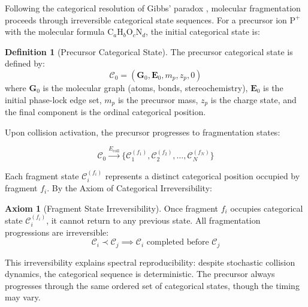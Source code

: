 \documentclass[twocolumn,10pt,a4paper]{article}
\theoremstyle{definition}
\newtheorem{definition}[theorem]{Definition}
\newtheorem{axiom}[theorem]{Axiom}
\theoremstyle{remark}
\begin{document}
Following the categorical resolution of Gibbs' paradox \cite{sachikonye2024gibbs}, molecular fragmentation proceeds through irreversible categorical state sequences. For a precursor ion $\text{P}^+$ with the molecular formula $\text{C}_a\text{H}_b\text{O}_c\text{N}_d$, the initial categorical state is:

\begin{definition}[Precursor Categorical State]
\label{def:precursor_state}
The precursor categorical state is defined by:
\begin{equation}
\mathcal{C}_0 = (\mathbf{G}_0, \mathbf{E}_0, m_p, z_p, 0)
\end{equation}
where $\mathbf{G}_0$ is the molecular graph (atoms, bonds, stereochemistry), $\mathbf{E}_0$ is the initial phase-lock edge set, $m_p$ is the precursor mass, $z_p$ is the charge state, and the final component is the ordinal categorical position.
\end{definition}

Upon collision activation, the precursor progresses to fragmentation states:

\begin{equation}
\mathcal{C}_0 \xrightarrow{E_{\text{coll}}} \{\mathcal{C}_1^{(f_1)}, \mathcal{C}_2^{(f_2)}, \ldots, \mathcal{C}_N^{(f_N)}\}
\end{equation}

Each fragment state $\mathcal{C}_i^{(f_i)}$ represents a distinct categorical position occupied by fragment $f_i$. By the Axiom of Categorical Irreversibility:

\begin{axiom}[Fragment State Irreversibility]
\label{ax:fragment_irreversibility}
Once fragment $f_i$ occupies categorical state $\mathcal{C}_i^{(f_i)}$, it cannot return to any previous state. All fragmentation progressions are irreversible:
\begin{equation}
\mathcal{C}_i \prec \mathcal{C}_j \implies \mathcal{C}_i \text{ completed before } \mathcal{C}_j
\end{equation}
\end{axiom}

This irreversibility explains spectral reproducibility: despite stochastic collision dynamics, the categorical sequence is deterministic. The precursor always progresses through the same ordered set of categorical states, though the timing may vary.
\end{document}
